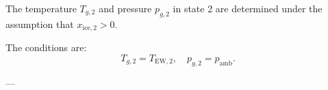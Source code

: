 The temperature \( T_{g,2} \) and pressure \( p_{g,2} \) in state 2 are determined under the assumption that \( x_{\text{ice},2} > 0 \).  

The conditions are:  
\[
T_{g,2} = T_{\text{EW},2}, \quad p_{g,2} = p_{\text{amb}}.
\]  

---